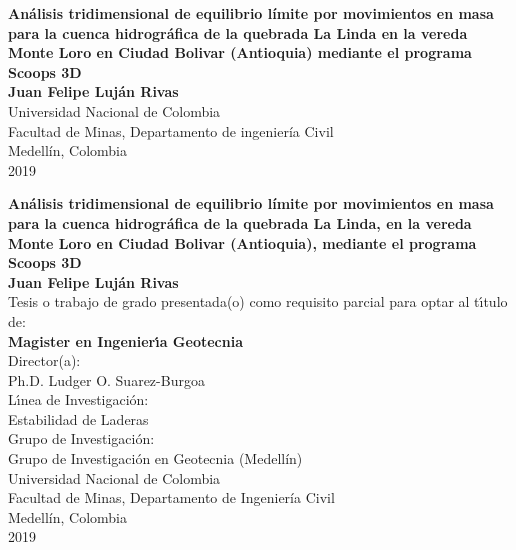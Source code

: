 \begin{center}
\begin{figure}
\centering%
%
\end{figure}
\thispagestyle{empty} \vspace*{1.5cm} \textbf{\huge
An\'{a}lisis tridimensional de equilibrio l\'{i}mite por movimientos en masa para la cuenca hidrogr\'{a}fica de la quebrada La Linda en la vereda Monte Loro en Ciudad Bolivar (Antioquia) mediante el programa Scoops 3D}\\[4.0cm]
\Large\textbf{Juan Felipe Luj\'{a}n Rivas}\\[4.0cm]
\small Universidad Nacional de Colombia\\
Facultad de Minas, Departamento de ingenier\'{i}a Civil\\
Medell\'{i}n, Colombia\\
2019\\
\end{center}

\newpage{\pagestyle{empty}\cleardoublepage}

\newpage
\begin{center}
\thispagestyle{empty} \vspace*{0cm} \textbf{\huge
An\'{a}lisis tridimensional de equilibrio l\'{i}mite por movimientos en masa para la cuenca hidrogr\'{a}fica de la quebrada La Linda, en la vereda Monte Loro en Ciudad Bolivar (Antioquia), mediante el programa Scoops 3D}\\[2.0cm]
\Large\textbf{Juan Felipe Luj\'{a}n Rivas}\\[2.0cm]
\small Tesis o trabajo de grado presentada(o) como requisito parcial para optar al
t\'{\i}tulo de:\\
\textbf{ Magister en Ingenier\'{\i}a Geotecnia}\\[1.5cm]
Director(a):\\
Ph.D. Ludger O. Suarez-Burgoa\\[1.0cm]
L\'{\i}nea de Investigaci\'{o}n:\\
Estabilidad de Laderas\\
Grupo de Investigaci\'{o}n:\\
Grupo de Investigaci\'{o}n en Geotecnia (Medell\'in)\\[0.5cm]
Universidad Nacional de Colombia\\
Facultad de Minas, Departamento de Ingenier\'{i}a Civil\\
Medell\'in, Colombia\\
2019\\
\end{center}



